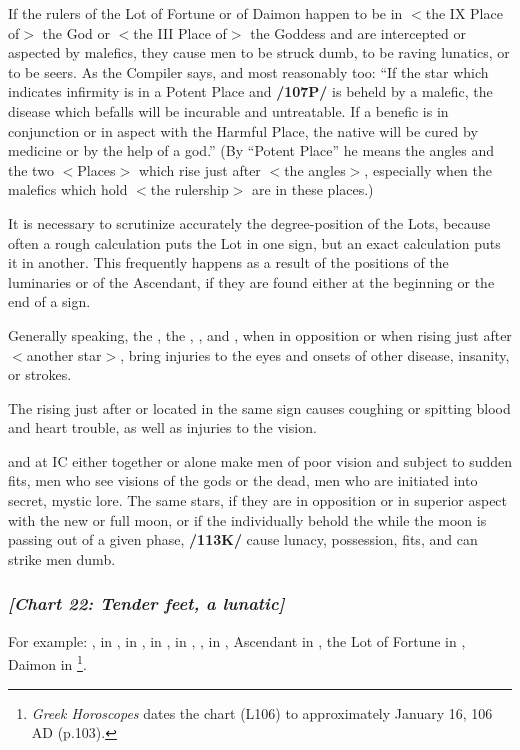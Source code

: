 If the rulers of the Lot of Fortune or of Daimon happen to be in $<$the IX Place of$>$ the God or $<$the III Place of$>$
the Goddess and are intercepted or aspected by malefics, they cause men to be struck dumb, to be raving lunatics, or to be seers. As the Compiler says, and most reasonably too: “If the star which indicates infirmity is in a Potent Place and \textbf{/107P/} is beheld by a malefic, the disease which befalls will be incurable and untreatable. If a benefic is in conjunction or in aspect with the Harmful Place, the native will be cured by medicine or by the help of a god.” (By “Potent Place” he means the angles and the two $<$Places$>$ which rise just after $<$the angles$>$, especially when the malefics which hold $<$the rulership$>$ are in these places.) 

It is necessary to scrutinize accurately the degree-position of the Lots, because often a rough calculation puts the Lot in one sign, but an exact calculation puts it in another. This frequently happens as a result of the positions of the luminaries or of the Ascendant, if they are found either at the beginning or the end of a sign. 

Generally speaking, the \Sun, the \Moon, \Saturn, and \Mercury, when in opposition or when rising just after $<$another star$>$, bring injuries to the eyes and onsets of other disease, insanity, or strokes. 

The \Sun\xspace rising just after \Mars\xspace or located in the same sign causes coughing or spitting blood and heart trouble, as well as injuries to the vision. 

\Saturn\xspace and \Mars\xspace at IC either together or alone make men of poor vision and subject to sudden fits, men who see visions of the gods or the dead, men who are initiated into secret, mystic lore. The same stars, if they are in opposition or in superior aspect with the new or full moon, or if the individually behold the \Moon\xspace while the moon is passing out of a given phase, \textbf{/113K/} cause lunacy,
possession, fits, and can strike men dumb.

\newpage
\subsubsection{\textit{[Chart 22: Tender feet, a lunatic]}}
For example: \Sun, \Saturn\xspace in \Capricorn, \Moon\xspace in \Scorpio, \Jupiter\xspace in \Leo, \Mars\xspace in \Pisces, \Venus, \Mercury\xspace in \Aquarius, Ascendant in \Virgo, the Lot of Fortune in \Scorpio, Daimon in \Cancer
\footnote{\textit{Greek Horoscopes} dates the chart (L106) to approximately January 16, 106 AD (p.103).}.

